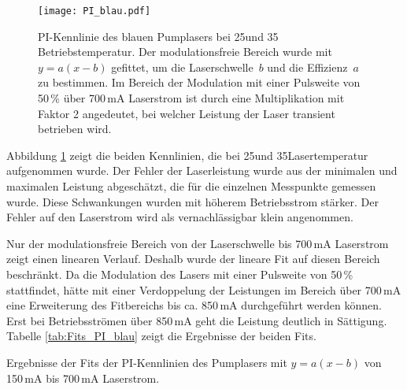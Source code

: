\begin{figure}[H]
\begin{center}
  \texttt{[image: PI\_blau.pdf]}
  \caption{PI-Kennlinie des blauen Pumplasers bei 25\grad und 35\grad
  Betriebstemperatur. Der modulationsfreie Bereich wurde mit $y=a(x-b)$
  gefittet, um die Laserschwelle~$b$ und die Effizienz~$a$ zu bestimmen. Im
  Bereich der Modulation mit einer Pulsweite von 50\,\% über 700\,mA Laserstrom ist durch eine
  Multiplikation mit Faktor 2 angedeutet, bei welcher Leistung der Laser
  transient betrieben wird.}
  \label{img:PI_blau}
\end{center}
\end{figure}

Abbildung \ref{img:PI_blau} zeigt die beiden Kennlinien, die bei 25\grad und 35\grad Lasertemperatur
aufgenommen wurde.
Der Fehler der Laserleistung wurde aus der minimalen und maximalen Leistung abgeschätzt, die für die
einzelnen Messpunkte gemessen wurde.
Diese Schwankungen wurden mit höherem Betriebsstrom stärker.
Der Fehler auf den Laserstrom wird als vernachlässigbar klein angenommen.

 Nur der modulationsfreie Bereich von der Laserschwelle bis 700\,mA Laserstrom
zeigt einen linearen Verlauf.
Deshalb wurde der lineare Fit auf diesen Bereich beschränkt.
Da die Modulation des Lasers mit einer Pulsweite von 50\,\% stattfindet, hätte mit einer
Verdoppelung der Leistungen im Bereich über 700\,mA eine Erweiterung des Fitbereichs bis ca. 850\,mA
durchgeführt werden können. Erst bei Betriebsströmen über 850\,mA geht die Leistung deutlich in
Sättigung.
Tabelle \ref{tab:Fits_PI_blau} zeigt die Ergebnisse der beiden Fits.


\begin{table}[htb]
\caption{Ergebnisse der Fits der PI-Kennlinien des Pumplasers mit $y=a(x-b)$ von 150\,mA bis
700\,mA Laserstrom.}

\label{tab:Fits_PI_blau}
\end{table}

\FloatBarrier
 